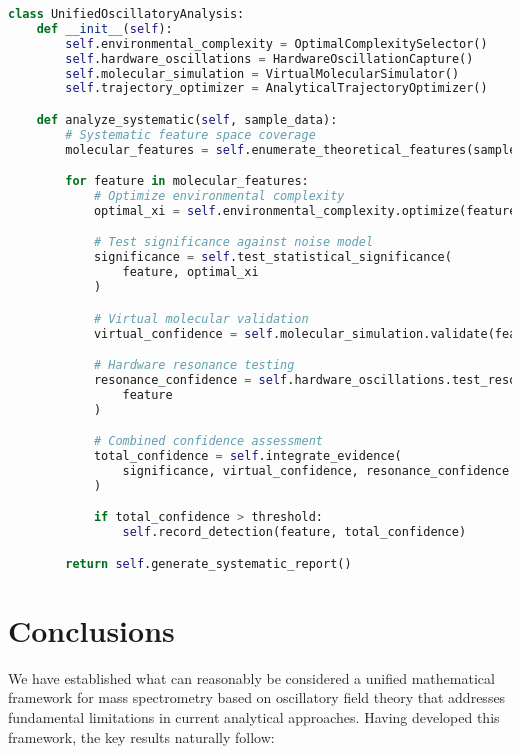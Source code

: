 \documentclass[11pt,a4paper]{article}
\begin{document}
\begin{lstlisting}[language=Python, caption=Unified Oscillatory Analysis Implementation]
class UnifiedOscillatoryAnalysis:
    def __init__(self):
        self.environmental_complexity = OptimalComplexitySelector()
        self.hardware_oscillations = HardwareOscillationCapture()
        self.molecular_simulation = VirtualMolecularSimulator()
        self.trajectory_optimizer = AnalyticalTrajectoryOptimizer()

    def analyze_systematic(self, sample_data):
        # Systematic feature space coverage
        molecular_features = self.enumerate_theoretical_features(sample_data)

        for feature in molecular_features:
            # Optimize environmental complexity
            optimal_xi = self.environmental_complexity.optimize(feature)

            # Test significance against noise model
            significance = self.test_statistical_significance(
                feature, optimal_xi
            )

            # Virtual molecular validation
            virtual_confidence = self.molecular_simulation.validate(feature)

            # Hardware resonance testing
            resonance_confidence = self.hardware_oscillations.test_resonance(
                feature
            )

            # Combined confidence assessment
            total_confidence = self.integrate_evidence(
                significance, virtual_confidence, resonance_confidence
            )

            if total_confidence > threshold:
                self.record_detection(feature, total_confidence)

        return self.generate_systematic_report()
\end{lstlisting}

\section{Conclusions}

We have established what can reasonably be considered a unified mathematical framework for mass spectrometry based on oscillatory field theory that addresses fundamental limitations in current analytical approaches. Having developed this framework, the key results naturally follow:
\end{document}
